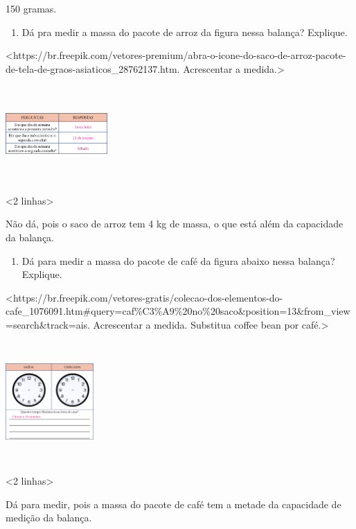 150 gramas.

\begin{enumerate}
\def\labelenumi{\alph{enumi})}
\item
  Dá pra medir a massa do pacote de arroz da figura nessa
  balança? Explique.
\end{enumerate}

\textless{}https://br.freepik.com/vetores-premium/abra-o-icone-do-saco-de-arroz-pacote-de-tela-de-graos-asiaticos\_28762137.htm.
Acrescentar a medida.\textgreater{}

\includegraphics[width=1.53125in,height=1.43597in]{media/image53.png}

\textless{}2 linhas\textgreater{}

Não dá, pois o saco de arroz tem 4 kg de massa, o que está além da capacidade da balança.

\begin{enumerate}
\def\labelenumi{\alph{enumi})}
\item
  Dá para medir a massa do pacote de café da figura abaixo nessa
  balança? Explique.
\end{enumerate}

\textless{}https://br.freepik.com/vetores-gratis/colecao-dos-elementos-do-cafe\_1076091.htm\#query=caf\%C3\%A9\%20no\%20saco\&position=13\&from\_view=search\&track=ais.
Acrescentar a medida. Substitua coffee bean por café.\textgreater{}

\includegraphics[width=1.32094in,height=1.80208in]{media/image54.png}

\textless{}2 linhas\textgreater{}

Dá para medir, pois a massa do pacote de café tem a metade da capacidade
de medição da balança.

